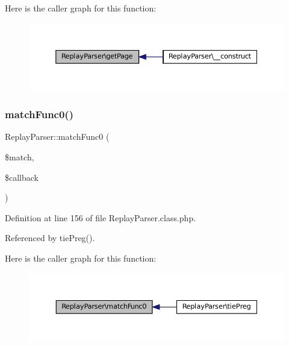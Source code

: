 Here is the caller graph for this function\+:\nopagebreak
\begin{figure}[H]
\begin{center}
\leavevmode
\includegraphics[width=350pt]{class_replay_parser_aba95b604703c0aae7956c51d11f3078b_icgraph}
\end{center}
\end{figure}
\mbox{\label{class_replay_parser_acd81b57421533d3bc9b27aa626656f03}} 
\subsubsection{\texorpdfstring{match\+Func0()}{matchFunc0()}}
{\footnotesize\ttfamily Replay\+Parser\+::match\+Func0 (\begin{DoxyParamCaption}\item[{}]{\$match,  }\item[{}]{\$callback }\end{DoxyParamCaption})}



Definition at line 156 of file Replay\+Parser.\+class.\+php.



Referenced by tie\+Preg().

Here is the caller graph for this function\+:\nopagebreak
\begin{figure}[H]
\begin{center}
\leavevmode
\includegraphics[width=350pt]{class_replay_parser_acd81b57421533d3bc9b27aa626656f03_icgraph}
\end{center}
\end{figure}
\mbox{\label{class_replay_parser_aaeed5f1f75f5699b789c615382badb88}} 
